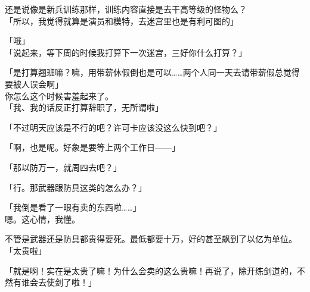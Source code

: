 还是说像是新兵训练那样，训练内容直接是去干高等级的怪物么？\\

「所以，我觉得就算是演员和模特，去迷宫里也是有利可图的」

「哦」\\

「说起来，等下周的时候我打算下一次迷宫，三好你什么打算？」

「是打算翘班嘛？嘛，用带薪休假倒也是可以……两个人同一天去请带薪假总觉得要被人误会啊」\\

你怎么这个时候害羞起来了。\\

「我、我的话反正打算辞职了，无所谓啦」

「不过明天应该是不行的吧？许可卡应该没这么快到吧？」

「啊，也是呢。好象是要等上两个工作日——」

「那以防万一，就周四去吧？」

「行。那武器跟防具这类的怎么办？」

「我倒是看了一眼有卖的东西啦……」\\

嗯。这心情，我懂。

不管是武器还是防具都贵得要死。最低都要十万，好的甚至飙到了以亿为单位。\\

「太贵啦」

「就是啊！实在是太贵了嘛！为什么会卖的这么贵嘛！再说了，除开练剑道的，不然有谁会去使剑了啦！」

